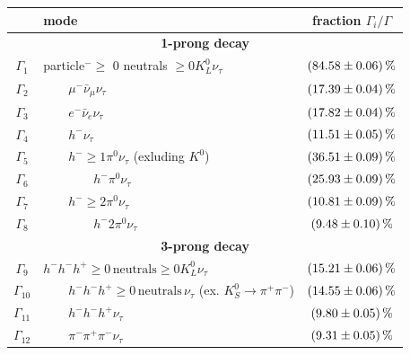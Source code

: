 \begin{table}[htbp]
		\centering
		\begin{tabular*}{\linewidth}{@{\extracolsep{\fill}}clc}
		\hline
		\hline
		&\textbf{mode}&  \textbf{fraction }$\Gamma_i/\Gamma$
		\\
		\hline
                \multicolumn{3}{c}{\textbf{1-prong decay}}
                \\
                $\Gamma_1$       & particle$^-\geq$ 0 neutrals $\geq 0K_L^0\nu_\tau$ & $\SI{84.58\pm0.06}{\percent}$
                \\
                $\Gamma_2$       & $\qquad \mu^-\bar{\nu}_\mu\nu_\tau$               & $\SI{17.39\pm0.04}{\percent}$
                \\
                $\Gamma_3$       & $\qquad e^-\bar{\nu}_e\nu_\tau$                   & $\SI{17.82\pm0.04}{\percent}$
                \\
                $\Gamma_4$       & $\qquad h^-\nu_\tau$                             & $\SI{11.51\pm0.05}{\percent}$
                \\
                $\Gamma_5$       & $\qquad h^-\geq 1\pi^0\nu_\tau$ (exluding $K^0$)  & $\SI{36.51\pm0.09}{\percent}$
                \\
                $\Gamma_6$       & $\qquad\qquad h^-\pi^0\nu_\tau$                   & $\SI{25.93\pm0.09}{\percent}$
                \\
                $\Gamma_7$       & $\qquad h^-\geq 2\pi^0\nu_\tau$                  & $\SI{10.81\pm0.09}{\percent}$
                \\
                $\Gamma_8$       & $\qquad\qquad h^-2\pi^0\nu_\tau$                   & $\SI{9.48\pm0.10}{\percent}$
                \\
                \hline
                \multicolumn{3}{c}{\textbf{3-prong decay}}
                \\
                $\Gamma_{9}$    & $h^-h^-h^+ \geq 0\,\text{neutrals}\geq 0K_L^0\nu_\tau$ & $\SI{15.21\pm0.06}{\percent}$
                \\
                $\Gamma_{10}$    & $\qquad h^-h^-h^+ \geq 0\,\text{neutrals}\,\nu_\tau$ (ex. $K_S^0\rightarrow \pi^+\pi^-$)      & $\SI{14.55\pm0.06}{\percent}$
                \\
                $\Gamma_{11}$    & $\qquad h^-h^-h^+\nu_\tau$                          & $\SI{9.80\pm0.05}{\percent}$
                \\
                $\Gamma_{12}$    & $\qquad \pi^-\pi^+\pi^-\nu_\tau$                          & $\SI{9.31\pm0.05}{\percent}$

\end{tabular*}
\end{table}
